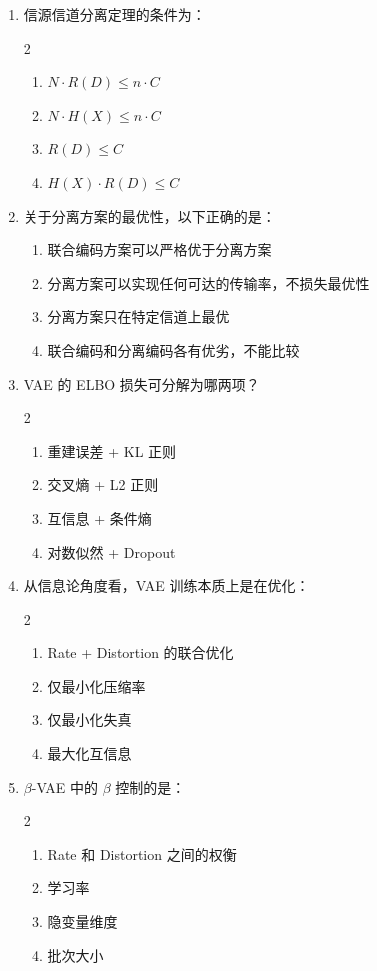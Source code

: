 \documentclass[12pt,a4paper]{ctexart}
\begin{document}
\begin{enumerate}[label=\arabic*., leftmargin=*]

\item 信源信道分离定理的条件为：
\begin{multicols}{2}
\begin{enumerate}[label=(\Alph*)]
  \item $N \cdot R(D) \leq n \cdot C$
  \item $N \cdot H(X) \leq n \cdot C$
  \item $R(D) \leq C$
  \item $H(X) \cdot R(D) \leq C$
\end{enumerate}
\end{multicols}

\item 关于分离方案的最优性，以下正确的是：
\begin{enumerate}[label=(\Alph*)]
  \item 联合编码方案可以严格优于分离方案
  \item 分离方案可以实现任何可达的传输率，不损失最优性
  \item 分离方案只在特定信道上最优
  \item 联合编码和分离编码各有优劣，不能比较
\end{enumerate}

\item VAE 的 ELBO 损失可分解为哪两项？
\begin{multicols}{2}
\begin{enumerate}[label=(\Alph*)]
  \item 重建误差 + KL 正则
  \item 交叉熵 + L2 正则
  \item 互信息 + 条件熵
  \item 对数似然 + Dropout
\end{enumerate}
\end{multicols}

\item 从信息论角度看，VAE 训练本质上是在优化：
\begin{multicols}{2}
\begin{enumerate}[label=(\Alph*)]
  \item Rate + Distortion 的联合优化
  \item 仅最小化压缩率
  \item 仅最小化失真
  \item 最大化互信息
\end{enumerate}
\end{multicols}

\item $\beta$-VAE 中的 $\beta$ 控制的是：
\begin{multicols}{2}
\begin{enumerate}[label=(\Alph*)]
  \item Rate 和 Distortion 之间的权衡
  \item 学习率
  \item 隐变量维度
  \item 批次大小
\end{enumerate}
\end{multicols}

\end{enumerate}
\end{document}
